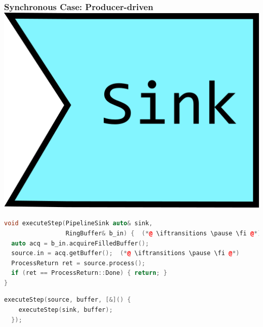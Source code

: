 \documentclass[aspectratio=169]{beamer}
\newif\iftransitions
\begin{document}
\begin{frame}[fragile]
  \frametitle{Synchronous Case: Producer-driven \hspace{180pt} \includegraphics[height=.1\textheight]{pipelinesgfx/sink.png}}

  \begin{lstlisting}[language={C++}]
void executeStep(PipelineSink auto& sink,
                 RingBuffer& b_in) {  (*@ \iftransitions \pause \fi @*)
  auto acq = b_in.acquireFilledBuffer();
  source.in = acq.getBuffer();  (*@ \iftransitions \pause \fi @*)
  ProcessReturn ret = source.process();
  if (ret == ProcessReturn::Done) { return; }
}
  \end{lstlisting}  \iftransitions \pause \fi
  
  \begin{lstlisting}[language={C++}]
executeStep(source, buffer, [&]() {
    executeStep(sink, buffer);
  });
  \end{lstlisting}
\end{frame}
\end{document}
